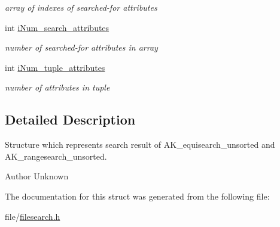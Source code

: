 \begin{DoxyCompactItemize}
\begin{DoxyCompactList}\small\item\em array of indexes of searched-\/for attributes \end{DoxyCompactList}\item 
\hypertarget{structsearch__result_a5c9f6447daff5cb8aa7183d71eeffb4a}{int \hyperlink{structsearch__result_a5c9f6447daff5cb8aa7183d71eeffb4a}{i\+Num\+\_\+search\+\_\+attributes}}\label{structsearch__result_a5c9f6447daff5cb8aa7183d71eeffb4a}

\begin{DoxyCompactList}\small\item\em number of searched-\/for attributes in array \end{DoxyCompactList}\item 
\hypertarget{structsearch__result_ad5720e57b8309e3922f05dc48cd0dc47}{int \hyperlink{structsearch__result_ad5720e57b8309e3922f05dc48cd0dc47}{i\+Num\+\_\+tuple\+\_\+attributes}}\label{structsearch__result_ad5720e57b8309e3922f05dc48cd0dc47}

\begin{DoxyCompactList}\small\item\em number of attributes in tuple \end{DoxyCompactList}\end{DoxyCompactItemize}


\subsection{Detailed Description}
Structure which represents search result of A\+K\+\_\+equisearch\+\_\+unsorted and A\+K\+\_\+rangesearch\+\_\+unsorted. 

\begin{DoxyAuthor}{Author}
Unknown 
\end{DoxyAuthor}


The documentation for this struct was generated from the following file\+:\begin{DoxyCompactItemize}
\item 
file/\hyperlink{filesearch_8h}{filesearch.\+h}\end{DoxyCompactItemize}

